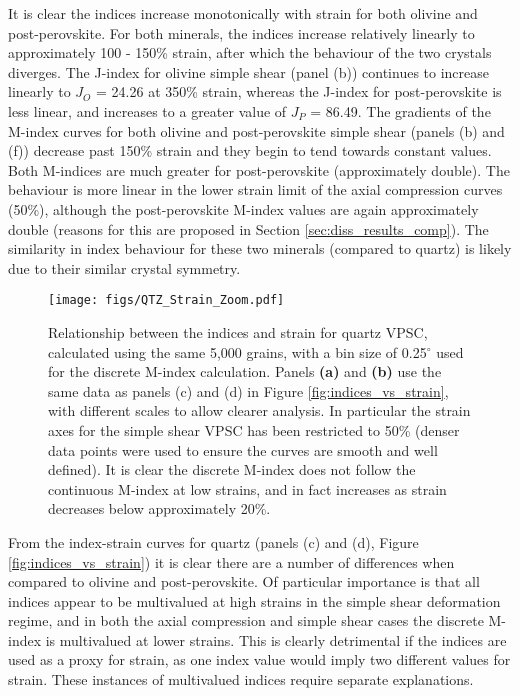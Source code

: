 \documentclass[a4paper,12pt,twoside]{report}
\numberwithin{equation}{chapter}
\begin{document}
It is clear the indices increase monotonically with strain for both olivine and post-perovskite. For both minerals, the indices increase relatively linearly to approximately 100 - 150\% strain, after which the behaviour of the two crystals diverges. The J-index for olivine simple shear (panel (b)) continues to increase linearly to $J_O$ = 24.26 at 350\% strain, whereas the J-index for post-perovskite is less linear, and increases to a greater value of $J_P$ = 86.49. The gradients of the M-index curves for both olivine and post-perovskite simple shear (panels (b) and (f)) decrease past 150\% strain and they begin to tend towards constant values. Both M-indices are much greater for post-perovskite (approximately double). The behaviour is more linear in the lower strain limit of the axial compression curves (50\%), although the post-perovskite M-index values are again approximately double (reasons for this are proposed in Section \ref{sec:diss_results_comp}). The similarity in index behaviour for these two minerals (compared to quartz) is likely due to their similar crystal symmetry.

\begin{figure}[h]
  \centering
    \texttt{[image: figs/QTZ\_Strain\_Zoom.pdf]}
  \caption[Relation of indices to strain (quartz VPSC)]{Relationship between the indices and strain for quartz VPSC, calculated using the same 5,000 grains, with a bin size of 0.25$^\circ$ used for the discrete M-index calculation. Panels \textbf{(a)} and \textbf{(b)} use the same data as panels (c) and (d) in Figure \ref{fig:indices_vs_strain}, with different scales to allow clearer analysis. In particular the strain axes for the simple shear VPSC has been restricted to 50\% (denser data points were used to ensure the curves are smooth and well defined). It is clear the discrete M-index does not follow the continuous M-index at low strains, and in fact increases as strain decreases below approximately 20\%.}
  \label{fig:indices_vs_strain_qtz}
\end{figure} 

From the index-strain curves for quartz (panels (c) and (d), Figure \ref{fig:indices_vs_strain}) it is clear there are a number of differences when compared to olivine and post-perovskite. Of particular importance is that all indices appear to be multivalued at high strains in the simple shear deformation regime, and in both the axial compression and simple shear cases the discrete M-index is multivalued at lower strains. This is clearly detrimental if the indices are used as a proxy for strain, as one index value would imply two different values for strain. These instances of multivalued indices require separate explanations.
\end{document}
